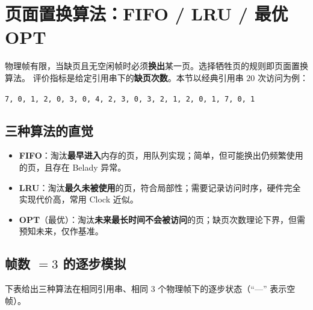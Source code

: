 \section{页面置换算法：FIFO / LRU / 最优 OPT}

物理帧有限，当缺页且无空闲帧时必须\textbf{换出}某一页。选择牺牲页的规则即页面置换算法。
评价指标是给定引用串下的\textbf{缺页次数}。本节以经典引用串 $20$ 次访问为例：

\begin{center}
\texttt{7, 0, 1, 2, 0, 3, 0, 4, 2, 3, 0, 3, 2, 1, 2, 0, 1, 7, 0, 1}
\end{center}

\subsection{三种算法的直觉}

\begin{itemize}
    \item \textbf{FIFO}：淘汰\textbf{最早进入}内存的页，用队列实现；简单，但可能换出仍频繁使用的页，且存在 Belady 异常。
    \item \textbf{LRU}：淘汰\textbf{最久未被使用}的页，符合局部性；需要记录访问时序，硬件完全实现代价高，常用 Clock 近似。
    \item \textbf{OPT}（最优）：淘汰\textbf{未来最长时间不会被访问}的页；缺页次数理论下界，但需预知未来，仅作基准。
\end{itemize}

\subsection{帧数 $=3$ 的逐步模拟}

下表给出三种算法在相同引用串、相同 $3$ 个物理帧下的逐步状态（``—'' 表示空帧）。

